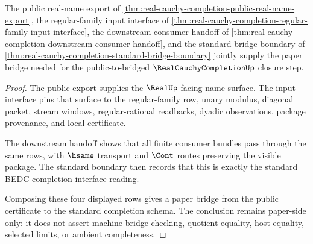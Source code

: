 \begin{theorem}
\label{thm:real-cauchy-completion-bridge-handoff}
The public real-name export of \autoref{thm:real-cauchy-completion-public-real-name-export}, the regular-family input interface of \autoref{thm:real-cauchy-completion-regular-family-input-interface}, the downstream consumer handoff of \autoref{thm:real-cauchy-completion-downstream-consumer-handoff}, and the standard bridge boundary of \autoref{thm:real-cauchy-completion-standard-bridge-boundary} jointly supply the paper bridge needed for the public-to-bridged $\RealCauchyCompletionUp$ closure step.
\end{theorem}
\begin{proof}
The public export supplies the $\RealUp$-facing name surface. The input interface pins that surface to the regular-family row, unary modulus, diagonal packet, stream windows, regular-rational readbacks, dyadic observations, package provenance, and local certificate.

The downstream handoff shows that all finite consumer bundles pass through the same rows, with $\hsame$ transport and $\Cont$ routes preserving the visible package. The standard boundary then records that this is exactly the standard BEDC completion-interface reading.

Composing these four displayed rows gives a paper bridge from the public certificate to the standard completion schema. The conclusion remains paper-side only: it does not assert machine bridge checking, quotient equality, host equality, selected limits, or ambient completeness.
\end{proof}

